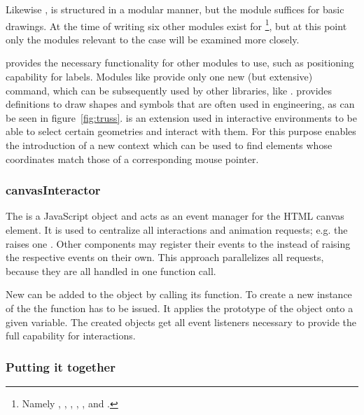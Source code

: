 Likewise ,  is structured in a modular manner, but the  module suffices for basic drawings.
At the time of writing six other modules exist for \footnote{Namely , , , , ,  and .}, but at this point only the modules relevant to the case will be examined more closely.

 provides the necessary functionality for other modules to use, such as positioning capability for labels.
Modules like  provide only one new (but extensive) command, which can be subsequently used by other libraries, like .
 provides definitions to draw shapes and symbols that are often used in engineering, as can be seen in figure~\ref{fig:truss}.
 is an extension used in interactive environments to be able to select certain geometries and interact with them.
For this purpose  enables the introduction of a new context which can be used to find elements whose coordinates match those of a corresponding mouse pointer.

\subsubsection{canvasInteractor}\label{ch:canvas_interactor}

The  is a JavaScript object and acts as an event manager for the HTML canvas element.
It is used to centralize all interactions and animation requests; e.g. the  raises one .
Other components may register their events to the  instead of raising the respective events on their own.
This approach parallelizes all requests, because they are all handled in one function call.

New  can be added to the  object by calling its  function.
To create a new instance of the  the  function has to be issued.
It applies the prototype of the  object onto a given variable.
The created objects get all event listeners necessary to provide the full capability for interactions.

\subsubsection{Putting it together}

